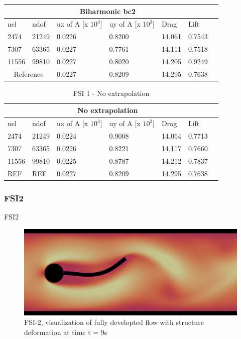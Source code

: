 \begin{table}[h!]
\begin{tabular}{ |p{1cm}||p{1cm}|p{2.5cm}|p{2.5cm}|p{2.7cm}|p{2.7cm}|p{1.2cm}|}
 \hline
\end{tabular}
\begin{tabular}{ |p{1cm}||p{1cm}|p{2.5cm}|p{2.5cm}|p{2.7cm}|p{2.7cm}|p{1.2cm}|}
 \hline
  \multicolumn{6}{|c|}{Biharmonic bc2} \\
   \hline
nel & ndof & ux of A [x $10^{3}$]  &uy of A [x $10^{3}$]& Drag  & Lift \\
 \hline
 2474    & 21249  &       0.0226 &       0.8200 & 14.061 & 0.7543 \\
 7307    & 63365  &       0.0227 &       0.7761 & 14.111 & 0.7518 \\
 11556   & 99810  &       0.0227 &       0.8020 & 14.205 & 0.9249  \\
  \hline
 \multicolumn{2}{|c|}{Reference} &  0.0227      &       0.8209      & 14.295  & 0.7638   \\
 \hline
\end{tabular}
\end{table}


\begin{table}[h!]
\centering
\caption{FSI 1 - No extrapolation}
\label{FSI1- No extrapolation}
\begin{tabular}{ |p{1cm}||p{1cm}|p{2.5cm}|p{2.5cm}|p{2.7cm}|p{2.7cm}|p{1.2cm}|}
 \hline
  \multicolumn{6}{|c|}{No extrapolation} \\
   \hline
nel & ndof & ux of A [x $10^{3}$]  &uy of A [x $10^{3}$]& Drag  & Lift \\
 \hline
 2474    & 21249  &       0.0224 &       0.9008 & 14.064 & 0.7713 \\
 7307    & 63365  &       0.0226  &       0.8221 & 14.117 & 0.7660 \\
 11556   & 99810  &       0.0225 &       0.8787 & 14.212 & 0.7837 \\
  \hline
 REF     & REF    &       0.0227      &       0.8209      & 14.295  & 0.7638   \\
 \hline
\end{tabular}

\end{table}




\newpage \newpage
\subsubsection{FSI2}
FSI2
\begin{figure}[h!]
  \centering
    \includegraphics[scale=0.2]{./Fig/fsi2flow.png}
      \caption{FSI-2, visualization of fully developted flow with structure deformation at time t = 9s}
\end{figure}

